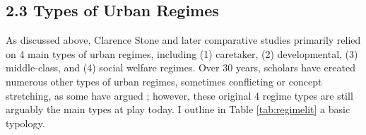 \documentclass[preprint, 3p,
authoryear]{elsarticle} %
\begin{document}
\hypertarget{types-of-urban-regimes}{%
\subsection{2.3 Types of Urban Regimes}\label{types-of-urban-regimes}}

As discussed above, Clarence Stone \citeyearpar{stone_1993} and later
comparative studies \citep{kilburn_2004, de_socio_2007} primarily relied
on 4 main types of urban regimes, including (1) caretaker, (2)
developmental, (3) middle-class, and (4) social welfare regimes. Over 30
years, scholars have created numerous other types of urban regimes,
sometimes conflicting or concept stretching, as some have argued
\citep{mossberger_and_stoker_2001}; however, these original 4 regime
types are still arguably the main types at play today. I outline in
Table \ref{tab:regimelit} a basic typology.
\end{document}
